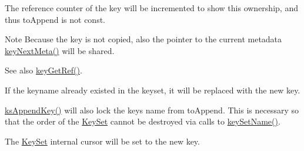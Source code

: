 The reference counter of the key will be incremented to show this ownership, and thus {\ttfamily to\+Append} is not const.

\begin{DoxyNote}{Note}
Because the key is not copied, also the pointer to the current metadata \hyperlink{group__keymeta_ga4c88342f580a4291455a801af71ce048}{key\+Next\+Meta()} will be shared.
\end{DoxyNote}
\begin{DoxySeeAlso}{See also}
\hyperlink{group__key_ga4aabc4272506dd63161db2bbb42de8ae}{key\+Get\+Ref()}.
\end{DoxySeeAlso}
If the keyname already existed in the keyset, it will be replaced with the new key.

\hyperlink{group__keyset_gaa5a1d467a4d71041edce68ea7748ce45}{ks\+Append\+Key()} will also lock the key\textquotesingle{}s name from {\ttfamily to\+Append}. This is necessary so that the order of the \hyperlink{classkdb_1_1KeySet}{Key\+Set} cannot be destroyed via calls to \hyperlink{group__keyname_ga7699091610e7f3f43d2949514a4b35d9}{key\+Set\+Name()}.

The \hyperlink{classkdb_1_1KeySet}{Key\+Set} internal cursor will be set to the new key.

